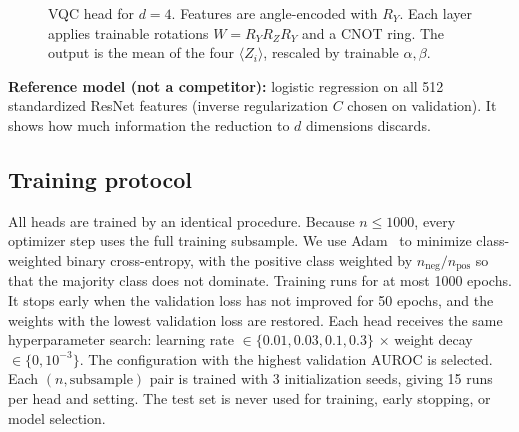 \documentclass[conference]{IEEEtran}
\begin{document}
\begin{figure}[t]
\centering
\ifdefined\quantikz
{}
\else
{}
\fi
\caption{VQC head for $d=4$. Features are angle-encoded with $R_Y$. Each
layer applies trainable rotations $W=R_YR_ZR_Y$ and a CNOT ring. The output
is the mean of the four $\langle Z_i\rangle$, rescaled by trainable
$\alpha,\beta$.}
\label{fig:circuit}
\end{figure}

\textbf{Reference model (not a competitor):} logistic regression on all 512
standardized ResNet features (inverse regularization $C$ chosen on
validation). It shows how much information the reduction to $d$ dimensions
discards.

\subsection{Training protocol}
All heads are trained by an identical procedure. Because $n\le1000$, every
optimizer step uses the full training subsample. We use Adam~\cite{kingma2015}
to minimize class-weighted binary cross-entropy, with the positive class
weighted by $n_{\mathrm{neg}}/n_{\mathrm{pos}}$ so that the majority class
does not dominate. Training runs for at most 1000 epochs. It stops early
when the validation loss has not improved for 50 epochs, and the weights
with the lowest validation loss are restored. Each head receives the same
hyperparameter search: learning rate $\in\{0.01,0.03,0.1,0.3\}$ $\times$ weight
decay $\in\{0,10^{-3}\}$. The configuration with the highest validation
AUROC is selected. Each $(n,\text{subsample})$ pair is trained with 3
initialization seeds, giving 15 runs per head and setting. The test set is
never used for training, early stopping, or model selection.
\end{document}
